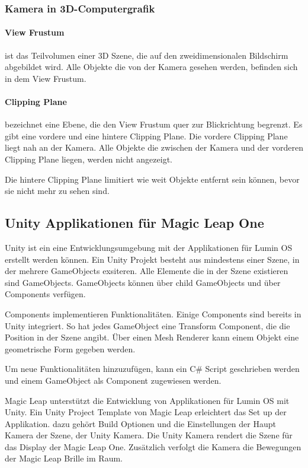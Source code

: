 \subsubsection{Kamera in 3D-Computergrafik}
\paragraph{View Frustum}
ist das Teilvolumen einer 3D Szene, die auf den zweidimensionalen Bildschirm abgebildet wird. Alle Objekte die von der Kamera gesehen werden, befinden sich in dem View Frustum.

\paragraph{Clipping Plane}
bezeichnet eine Ebene, die den View Frustum quer zur Blickrichtung begrenzt. 
Es gibt eine vordere und eine hintere Clipping Plane.
Die vordere Clipping Plane liegt nah an der Kamera. Alle Objekte die zwischen der Kamera und der vorderen Clipping Plane liegen, werden nicht angezeigt.

Die hintere Clipping Plane limitiert wie weit Objekte entfernt sein können, bevor sie nicht mehr zu sehen sind.


\subsection{Unity Applikationen für Magic Leap One}

Unity ist ein eine Entwicklungsumgebung mit der Applikationen für Lumin OS erstellt werden können. Ein Unity Projekt besteht aus mindestens einer Szene, in der mehrere GameObjects exsiteren. Alle Elemente die in der Szene existieren sind GameObjects. GameObjects können über child GameObjects und über Components verfügen. 


Components implementieren Funktionalitäten. Einige Components sind bereits in Unity integriert. So hat jedes GameObject eine Transform Component, die die Position in der Szene angibt. Über einen Mesh Renderer kann einem Objekt eine geometrische Form gegeben werden.

Um neue Funktionalitäten hinzuzufügen, kann ein C\# Script geschrieben werden und einem GameObject als Component zugewiesen werden.

Magic Leap unterstützt die Entwicklung von Applikationen für Lumin OS mit Unity. Ein Unity Project Template von Magic Leap erleichtert das Set up der Applikation. dazu gehört Build Optionen und die Einstellungen der Haupt Kamera der Szene, der Unity Kamera. Die Unity Kamera rendert die Szene für das Display der Magic Leap One. Zusätzlich verfolgt die Kamera die Bewegungen der Magic Leap Brille im Raum. %

